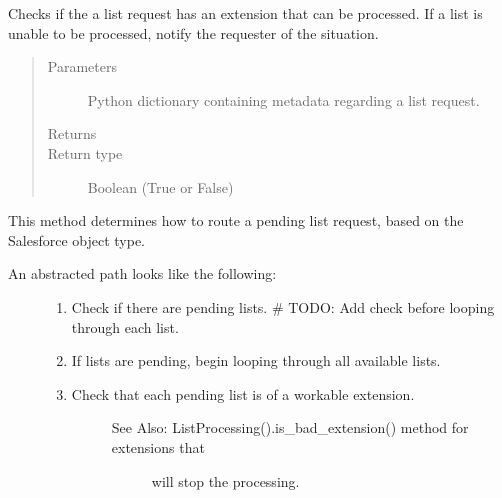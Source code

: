 \documentclass[letterpaper,10pt,english]{sphinxmanual}
\begin{document}
\begin{fulllineitems}
\begin{fulllineitems}
\label{\detokenize{index:ListManagement.list_processing.ListProcessing.is_bad_extension}}
Checks if the a list request has an extension that can be processed. If a list is
unable to be processed, notify the requester of the situation.
\begin{quote}\begin{description}
\item[{Parameters}] \leavevmode
{} \textendash{} Python dictionary containing metadata regarding a list request.

\item[{Returns}] \leavevmode


\item[{Return type}] \leavevmode
Boolean (True or False)

\end{description}\end{quote}

\end{fulllineitems}


\begin{fulllineitems}
\label{\detokenize{index:ListManagement.list_processing.ListProcessing.main_contact_based_processing}}
This method determines how to route a pending list request, based on the Salesforce object type.
\begin{description}
\item[{An abstracted path looks like the following:}] \leavevmode\begin{enumerate}
\def\theenumi{\arabic{enumi}}
\def\labelenumi{\theenumi )}
\makeatletter\def\p@enumii{\p@enumi \theenumi )}\makeatother
\item {} 
Check if there are pending lists.  \# TODO: Add check before looping through each list.

\item {} 
If lists are pending, begin looping through all available lists.

\item {} \begin{description}
\item[{Check that each pending list is of a workable extension.}] \leavevmode\begin{description}
\item[{See Also: ListProcessing().is\_bad\_extension() method for extensions that}] \leavevmode
will stop the processing.


\end{description}
\end{description}
\end{enumerate}
\end{description}
\end{fulllineitems}
\end{fulllineitems}
\end{document}
